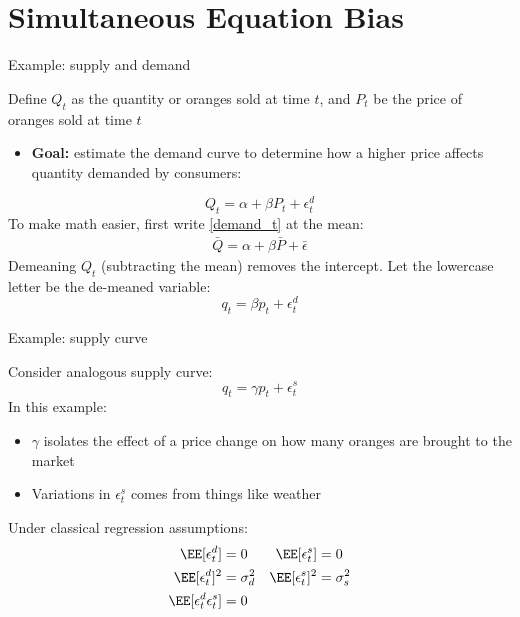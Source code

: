 \documentclass[compress, 8pt]{beamer}
\begin{document}
\section[Simultaneous Equation Bias]{Simultaneous Equation Bias}
\miniframesoff
\begin{frame}
    \tableofcontents[currentsection]
\end{frame}
\miniframeson


\begin{frame}{Example: supply and demand}

Define $Q_t$ as the quantity or oranges sold at time $t$, and $P_t$ be the price of oranges sold at time $t$
\begin{itemize}
    \item \textbf{Goal:} estimate the demand curve to determine how a higher price affects quantity demanded by consumers:
\end{itemize}
\begin{equation}\label{demand_t}
    Q_t = \alpha + \beta P_t + \epsilon_t^d
\end{equation}
To make math easier, first write \eqref{demand_t} at the mean:
\begin{align*}
    \bar{Q} = \alpha + \beta \bar{P} + \bar{\epsilon}
\end{align*}
Demeaning $Q_t$ (subtracting the mean) removes the intercept. Let the lowercase letter be the de-meaned variable:
\begin{equation*}
    q_t = \beta p_t + \epsilon_t^d
\end{equation*}

\end{frame}

\begin{frame}{Example: supply curve}

Consider analogous supply curve:
\begin{equation*}
    q_t = \gamma p_t + \epsilon_t^s
\end{equation*}
In this example:
\begin{itemize}
    \item $\gamma$ isolates the effect of a price change on how many oranges are brought to the market
\item Variations in $\epsilon_t^s$ comes from things like weather
\end{itemize}
Under classical regression assumptions:
\begin{align*}
    \EE [\epsilon_t^d] &= 0 &\EE [ \epsilon_t^s ] &= 0 \\
    \EE [\epsilon_{t}^{d}]^{2} &= \sigma_{d}^{2} &\EE [\epsilon_{t}^{s}]^{2} &=\sigma_{s}^{2}\\
    \EE [\epsilon_{t}^{d}\epsilon_{t}^{s}] &= 0
\end{align*}


\end{frame}
\end{document}

